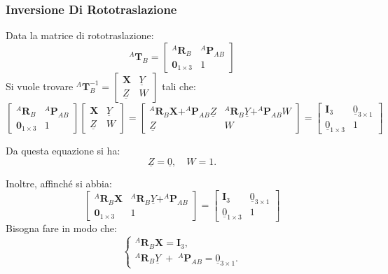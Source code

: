 ﻿\documentclass[11pt, a4paper]{article}
\begin{document}
\subsubsection{Inversione Di Rototraslazione}
Data la matrice di rototraslazione:
\[
    ^{A}\mathbf{T}_{B} =
        \begin{bmatrix}
            ^{A}\mathbf{R}_{B} & ^{A}\mathbf{P}_{AB} \\
            \mathbf{0}_{1 \times 3} & 1
        \end{bmatrix}
\]
Si vuole trovare $ ^{A}\mathbf{T}_{B}^{-1} = \begin{bmatrix} \boldsymbol{X} & \underline{Y} \\ \underline{Z} & W \end{bmatrix} $ tali che:
\[
    \begin{bmatrix}
        ^{A}\mathbf{R}_{B} & ^{A}\mathbf{P}_{AB} \\
        \mathbf{0}_{1 \times 3} & 1
    \end{bmatrix}
    \begin{bmatrix}
        \boldsymbol{X} & \underline{Y} \\
        \underline{Z} & W
    \end{bmatrix}
    =
    \begin{bmatrix}
        ^{A}\mathbf{R}_{B}\boldsymbol{X} + ^{A}\mathbf{P}_{AB}\underline{Z} & ^{A}\mathbf{R}_{B}\underline{Y} + ^{A}\mathbf{P}_{AB}W \\
        \underline{Z} & W
    \end{bmatrix}
    =
    \begin{bmatrix}
        \mathbf{I}_{3} & \underline{0}_{3 \times 1} \\
        \underline{0}_{1 \times 3} & 1
    \end{bmatrix}
\]

Da questa equazione si ha:
\[
    \underline{Z} = \underline{0}, \quad W = 1.
\]

Inoltre, affinché si abbia:
\[
    \begin{bmatrix}
        ^{A}\mathbf{R}_{B}\boldsymbol{X} & ^{A}\mathbf{R}_{B}\underline{Y} + ^{A}\mathbf{P}_{AB} \\
        \mathbf{0}_{1 \times 3} & 1
    \end{bmatrix}
    =
    \begin{bmatrix}
        \mathbf{I}_{3} & \underline{0}_{3 \times 1} \\
        \underline{0}_{1 \times 3} & 1
    \end{bmatrix}
\]
Bisogna fare in modo che:
\[
    \begin{cases}
        ^{A}\mathbf{R}_{B}\boldsymbol{X} = \mathbf{I}_{3}, \\
        ^{A}\mathbf{R}_{B}\underline{Y} \; + \; ^{A}\mathbf{P}_{AB} = \underline{0}_{3 \times 1}.
    \end{cases}
\]
\end{document}
